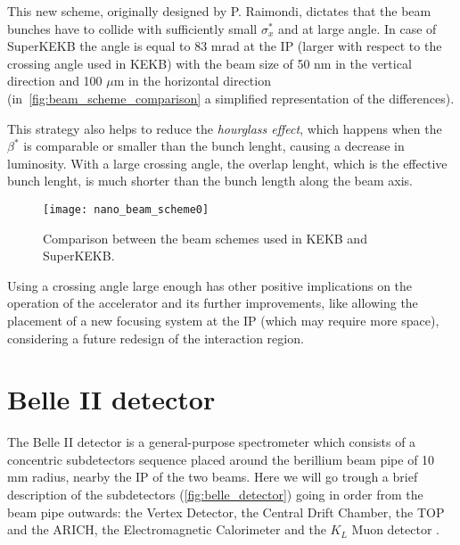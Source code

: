 This new scheme, originally designed by P. Raimondi\cite{Raimondi}, dictates that the beam bunches have to collide with sufficiently small $\sigma_{x}^{*}$ and at large angle. In case of SuperKEKB the angle is equal to 83 mrad at the IP (larger with respect to the crossing angle used in KEKB) with the beam size of 50 nm in the vertical direction and 100 $\mu$m in the horizontal direction (in~\autoref{fig:beam_scheme_comparison} a simplified representation of the differences).

This strategy also helps to reduce the \textit{hourglass effect}, which happens when the $\beta^{*}$ is comparable or smaller than the bunch lenght, causing a decrease in luminosity. With a large crossing angle, the overlap lenght, which is the effective bunch lenght, is much shorter than the bunch length along the beam axis. \\


\begin{figure}[h!]
\centering
\texttt{[image: nano\_beam\_scheme0]}
\caption{Comparison between the beam schemes used in KEKB and SuperKEKB.}
\label{fig:beam_scheme_comparison}
\end{figure}

Using a crossing angle large enough has other positive implications on the operation of the accelerator and its further improvements, like allowing the placement of a new focusing system at the IP (which may require more space), considering a future redesign of the interaction region.

\begin{comment}
In~\autoref{fig:beampar} are reported the main machine parameters (default value) of the SuperKEKB accelerator.

\begin{figure}[h!]
\centering
\texttt{[image: beam\_par]}
\caption{Machine parameters of SuperKEKB. The mark ''*'' indicate values in the IP.}
\label{fig:beampar}
\end{figure}
\end{comment}


\section{Belle II detector}


The Belle II detector is a general-purpose spectrometer which consists of a concentric subdetectors sequence placed around the berillium beam pipe of 10 mm radius, nearby the IP of the two beams. Here we will go trough a brief description of the subdetectors (\autoref{fig:belle_detector}) going in order from the beam pipe outwards: the Vertex Detector, the Central Drift Chamber, the TOP and the ARICH, the Electromagnetic Calorimeter and the $K_{L}$ Muon detector \cite{Belle-II:2010dht, physics_book, Adachi:2018qme}.\\

